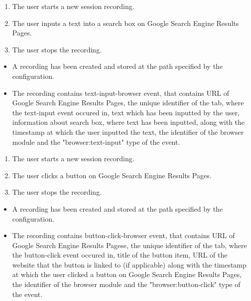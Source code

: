 \begin{tests}
	{\begin{enumerate}
		\item The \gls{user} starts a new session recording.
		\item The \gls{user} inputs a text into a search box on Google Search Engine Results Pages.
		\item The \gls{user} stops the recording.
	\end{enumerate}}
	{\begin{itemize}
		\item A recording has been created and stored at the path specified by the configuration.
		\item The recording contains text-input-browser event, that contains URL of Google Search Engine Results Pages, the unique identifier of the tab, where the text-input event occured in, text which has been inputted by the user, information about search box, where text has been inputted, along with the timestamp at which the user inputted the text, the identifier of the browser module and the "browser:text-input" type of the event.
	\end{itemize}}
	
	
	{\begin{enumerate}
		\item The \gls{user} starts a new session recording.
		\item The \gls{user} clicks a button on Google Search Engine Results Pages.
		\item The \gls{user} stops the recording.
	\end{enumerate}}
	{\begin{itemize}
		\item A recording has been created and stored at the path specified by the configuration.
		\item The recording contains button-click-browser event, that contains URL of Google Search Engine Results Pagese, the unique identifier of the tab, where the button-click event occured in, title of the button item, URL of the website that the button is linked to (if applicable) along with the timestamp at which the user clicked a button on Google Search Engine Results Pages, the identifier of the browser module and the "browser:button-click" type of the event.
	\end{itemize}}
	

\end{tests}
